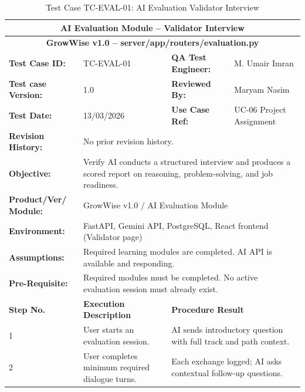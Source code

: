 \documentclass{FastFyp}
\begin{document}
\vspace{0.5em}

\begin{table}[H]
\footnotesize
\centering
\caption{Test Case TC-EVAL-01: AI Evaluation Validator Interview}
\label{tab:tceval}
\begin{tabular}{|p{2.5cm}|p{4cm}|p{2.5cm}|p{4.5cm}|}
\hline
\multicolumn{4}{|c|}{\textbf{AI Evaluation Module -- Validator Interview}} \\ \hline
\multicolumn{4}{|c|}{\textbf{GrowWise v1.0 -- server/app/routers/evaluation.py}} \\ \hline
\textbf{Test Case ID:} & TC-EVAL-01 & \textbf{QA Test Engineer:} & M. Umair Imran \\ \hline
\textbf{Test case Version:} & 1.0 & \textbf{Reviewed By:} & Maryam Nasim \\ \hline
\textbf{Test Date:} & 13/03/2026 & \textbf{Use Case Ref:} & UC-06 Project Assignment \\ \hline
\textbf{Revision History:} & \multicolumn{3}{p{11cm}|}{No prior revision history.} \\ \hline
\textbf{Objective:} & \multicolumn{3}{p{11cm}|}{Verify AI conducts a structured interview and produces a scored report on reasoning, problem-solving, and job readiness.} \\ \hline
\textbf{Product/Ver/ Module:} & \multicolumn{3}{p{11cm}|}{GrowWise v1.0 / AI Evaluation Module} \\ \hline
\textbf{Environment:} & \multicolumn{3}{p{11cm}|}{FastAPI, Gemini API, PostgreSQL, React frontend (Validator page)} \\ \hline
\textbf{Assumptions:} & \multicolumn{3}{p{11cm}|}{Required learning modules are completed. AI API is available and responding.} \\ \hline
\textbf{Pre-Requisite:} & \multicolumn{3}{p{11cm}|}{Required modules must be completed. No active evaluation session must already exist.} \\ \hline
\textbf{Step No.} & \textbf{Execution Description} & \multicolumn{2}{p{7cm}|}{\textbf{Procedure Result}} \\ \hline
1 & User starts an evaluation session. & \multicolumn{2}{p{7cm}|}{AI sends introductory question with full track and path context.} \\ \hline
2 & User completes minimum required dialogue turns. & \multicolumn{2}{p{7cm}|}{Each exchange logged; AI asks contextual follow-up questions.} \\ \hline

\end{tabular}
\end{table}
\end{document}
